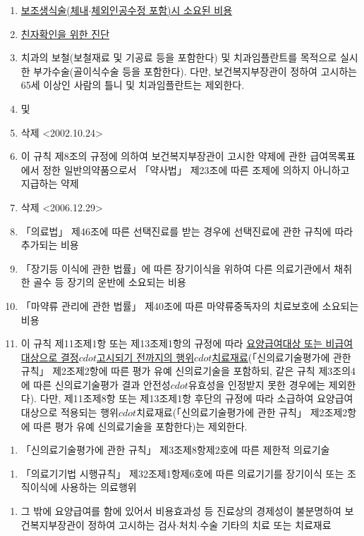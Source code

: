 \begin{enumerate}[1.]
\begin{enumerate}[가.]
	\item \uline{보조생식술(체내$\cdot$체외인공수정 포함)시 소요된 비용}
	\item \uline{친자확인을 위한 진단} 
	\item 치과의 보철(보철재료 및 기공료 등을 포함한다) 및 치과임플란트를 목적으로 실시한 부가수술(골이식수술 등을 포함한다). 다만, 보건복지부장관이 정하여 고시하는 65세 이상인 사람의 틀니 및 치과임플란트는 제외한다.
	\item 및 \item 삭제 <2002.10.24>
	\item 이 규칙 제8조의 규정에 의하여 보건복지부장관이 고시한 약제에 관한 급여목록표에서 정한 일반의약품으로서 「약사법」 제23조에 따른 조제에 의하지 아니하고 지급하는 약제
	\item 삭제 <2006.12.29>
	\item 「의료법」 제46조에 따른 선택진료를 받는 경우에 선택진료에 관한 규칙에 따라 추가되는 비용
	\item 「장기등 이식에 관한 법률」에 따른 장기이식을 위하여 다른 의료기관에서 채취한 골수 등 장기의 운반에 소요되는 비용
	\item 「마약류 관리에 관한 법률」 제40조에 따른 마약류중독자의 치료보호에 소요되는 비용
	\item 이 규칙 제11조제1항 또는 제13조제1항의 규정에 따라 \uline{요양급여대상 또는 비급여대상으로 결정$cdot$고시되기 전까지의 행위$cdot$치료재료}(「신의료기술평가에 관한 규칙」 제2조제2항에 따른 평가 유예 신의료기술을 포함하되, 같은 규칙 제3조의4에 따른 신의료기술평가 결과 안전성$cdot$유효성을 인정받지 못한 경우에는 제외한다). 다만, 제11조제8항 또는 제13조제1항 후단의 규정에 따라 소급하여 요양급여대상으로 적용되는 행위$cdot$치료재료(「신의료기술평가에 관한 규칙」 제2조제2항에 따른 평가 유예 신의료기술을 포함한다)는 제외한다.
	\end{enumerate}
	\begin{enumerate}[거.]\tightlist
	\item 「신의료기술평가에 관한 규칙」 제3조제8항제2호에 따른 제한적 의료기술
	\end{enumerate}
	\begin{enumerate}[너.]\tightlist
	\item 「의료기기법 시행규칙」 제32조제1항제6호에 따른 의료기기를 장기이식 또는 조직이식에 사용하는 의료행위
	\end{enumerate}
	\begin{enumerate}[더.]\tightlist
	\item  그 밖에 요양급여를 함에 있어서 비용효과성 등 진료상의 경제성이 불분명하여 보건복지부장관이 정하여 고시하는 검사$\cdot$처치$\cdot$수술 기타의 치료 또는 치료재료

\end{enumerate}
\end{enumerate}
